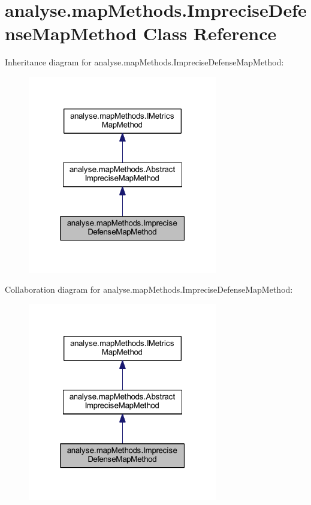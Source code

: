\hypertarget{classanalyse_1_1map_methods_1_1_imprecise_defense_map_method}{}\section{analyse.\+map\+Methods.\+Imprecise\+Defense\+Map\+Method Class Reference}
\label{classanalyse_1_1map_methods_1_1_imprecise_defense_map_method}


Inheritance diagram for analyse.\+map\+Methods.\+Imprecise\+Defense\+Map\+Method\+:
\nopagebreak
\begin{figure}[H]
\begin{center}
\leavevmode
\includegraphics[width=235pt]{classanalyse_1_1map_methods_1_1_imprecise_defense_map_method__inherit__graph}
\end{center}
\end{figure}


Collaboration diagram for analyse.\+map\+Methods.\+Imprecise\+Defense\+Map\+Method\+:
\nopagebreak
\begin{figure}[H]
\begin{center}
\leavevmode
\includegraphics[width=235pt]{classanalyse_1_1map_methods_1_1_imprecise_defense_map_method__coll__graph}
\end{center}
\end{figure}
